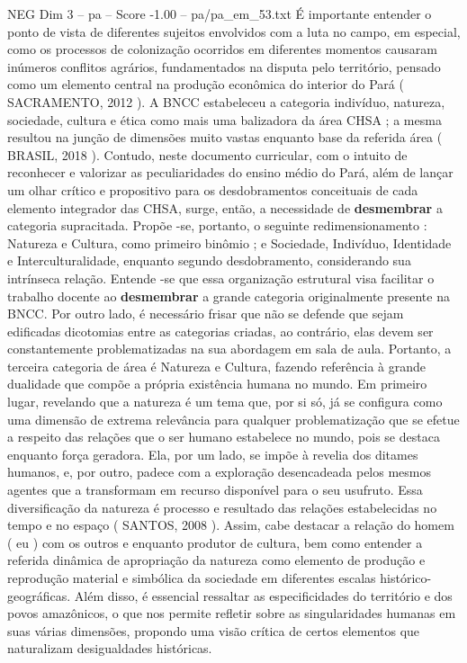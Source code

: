 \begin{textsample}{NEG Dim 3 – pa – Score -1.00 – pa/pa\_em\_53.txt}
É importante entender o ponto de vista de diferentes sujeitos envolvidos com a luta no campo, em especial, como os processos de colonização ocorridos em diferentes momentos causaram inúmeros conflitos agrários, fundamentados na disputa pelo território, pensado como um elemento central na produção econômica do interior do Pará ( SACRAMENTO, 2012 ).
A BNCC estabeleceu a categoria indivíduo, natureza, sociedade, cultura e ética como mais uma balizadora da área CHSA ; a mesma resultou na junção de dimensões muito vastas enquanto base da referida área ( BRASIL, 2018 ).
Contudo, neste documento curricular, com o intuito de reconhecer e valorizar as peculiaridades do ensino médio do Pará, além de lançar um olhar crítico e propositivo para os desdobramentos conceituais de cada elemento integrador das CHSA, surge, então, a necessidade de \textbf{desmembrar} a categoria supracitada.
Propõe -se, portanto, o seguinte redimensionamento : Natureza e Cultura, como primeiro binômio ; e Sociedade, Indivíduo, Identidade e Interculturalidade, enquanto segundo desdobramento, considerando sua intrínseca relação.
Entende -se que essa organização estrutural visa facilitar o trabalho docente ao \textbf{desmembrar} a grande categoria originalmente presente na BNCC.
Por outro lado, é necessário frisar que não se defende que sejam edificadas dicotomias entre as categorias criadas, ao contrário, elas devem ser constantemente problematizadas na sua abordagem em sala de aula.
Portanto, a terceira categoria de área é Natureza e Cultura, fazendo referência à grande dualidade que compõe a própria existência humana no mundo.
Em primeiro lugar, revelando que a natureza é um tema que, por si só, já se configura como uma dimensão de extrema relevância para qualquer problematização que se efetue a respeito das relações que o ser humano estabelece no mundo, pois se destaca enquanto força geradora.
Ela, por um lado, se impõe à revelia dos ditames humanos, e, por outro, padece com a exploração desencadeada pelos mesmos agentes que a transformam em recurso disponível para o seu usufruto.
Essa diversificação da natureza é processo e resultado das relações estabelecidas no tempo e no espaço ( SANTOS, 2008 ).
Assim, cabe destacar a relação do homem ( eu ) com os outros e enquanto produtor de cultura, bem como entender a referida dinâmica de apropriação da natureza como elemento de produção e reprodução material e simbólica da sociedade em diferentes escalas histórico-geográficas.
Além disso, é essencial ressaltar as especificidades do território e dos povos amazônicos, o que nos permite refletir sobre as singularidades humanas em suas várias dimensões, propondo uma visão crítica de certos elementos que naturalizam desigualdades históricas.

\end{textsample}
